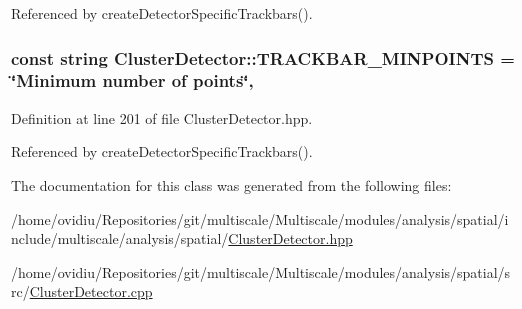 Referenced by create\-Detector\-Specific\-Trackbars().

\hypertarget{classmultiscale_1_1analysis_1_1ClusterDetector_a7f0fbbf3de8479b106893c4a8161bdaf}{
\subsubsection[{T\-R\-A\-C\-K\-B\-A\-R\-\_\-\-M\-I\-N\-P\-O\-I\-N\-T\-S}]{\setlength{\rightskip}{0pt plus 5cm}const string Cluster\-Detector\-::\-T\-R\-A\-C\-K\-B\-A\-R\-\_\-\-M\-I\-N\-P\-O\-I\-N\-T\-S = \char`\"{}Minimum number of points\char`\"{}\hspace{0.3cm}{\ttfamily [static]}, {\ttfamily [private]}}}\label{classmultiscale_1_1analysis_1_1ClusterDetector_a7f0fbbf3de8479b106893c4a8161bdaf}


Definition at line 201 of file Cluster\-Detector.\-hpp.



Referenced by create\-Detector\-Specific\-Trackbars().



The documentation for this class was generated from the following files\-:\begin{DoxyCompactItemize}
\item 
/home/ovidiu/\-Repositories/git/multiscale/\-Multiscale/modules/analysis/spatial/include/multiscale/analysis/spatial/\hyperlink{ClusterDetector_8hpp}{Cluster\-Detector.\-hpp}\item 
/home/ovidiu/\-Repositories/git/multiscale/\-Multiscale/modules/analysis/spatial/src/\hyperlink{ClusterDetector_8cpp}{Cluster\-Detector.\-cpp}\end{DoxyCompactItemize}
